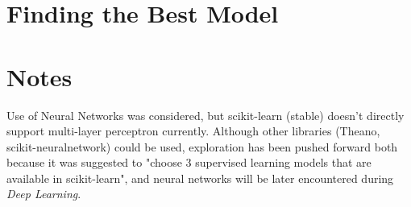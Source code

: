 \documentclass{article}
\begin{document}
	\section{Finding the Best Model}
	
	\section{Notes}
	Use of Neural Networks was considered, but scikit-learn (stable) doesn't directly support multi-layer perceptron currently. Although other libraries (Theano, scikit-neuralnetwork) could be used, exploration has been pushed forward both because it was suggested to "choose 3 supervised learning models that are available in scikit-learn", and neural networks will be later encountered during \emph{Deep Learning}.
	
	
	
\end{document}
